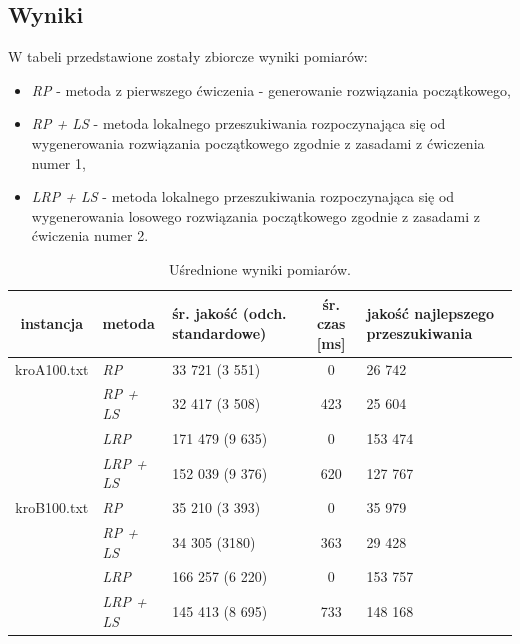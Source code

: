 \documentclass{article}
\begin{document}
\subsection{Wyniki}
W tabeli przedstawione zostały zbiorcze wyniki pomiarów:
\begin{itemize}
	\item \emph{RP} - metoda z pierwszego ćwiczenia - generowanie rozwiązania początkowego,
	\item \emph{RP + LS} - metoda lokalnego przeszukiwania rozpoczynająca się od wygenerowania rozwiązania początkowego zgodnie z zasadami z ćwiczenia numer 1,
	\item \emph{LRP + LS} - metoda lokalnego przeszukiwania rozpoczynająca się od wygenerowania losowego rozwiązania początkowego zgodnie z zasadami z ćwiczenia numer 2.
\end{itemize}
	

\begin{table}[h!]
\begin{center}
\centering
  \begin{tabular}{| c | D | S | c | S | }
\hline
	instancja & metoda & śr. jakość (odch. standardowe) & śr. czas [ms] & jakość najlepszego przeszukiwania \\ \hline
    kroA100.txt & \emph{RP} & 33 721 (3 551) & 0 & 26 742 \\
     & \emph{RP + LS} & 32 417 (3 508) & 423 & 25 604 \\
     & \emph{LRP} & 171 479 (9 635) & 0 & 153 474 \\
     & \emph{LRP + LS} & 152 039 (9 376) & 620 & 127 767 \\
\hline
    kroB100.txt & \emph{RP} & 35 210 (3 393) & 0 & 35 979 \\
     & \emph{RP + LS} & 34 305 (3180) & 363 & 29 428 \\
     & \emph{LRP} & 166 257 (6 220) & 0 & 153 757 \\
     & \emph{LRP + LS} & 145 413 (8 695) & 733 & 148 168 \\
\hline
  \end{tabular}
\end{center}
\caption{Uśrednione wyniki pomiarów.} \label{tab:wynikils}
\end{table}
\end{document}

